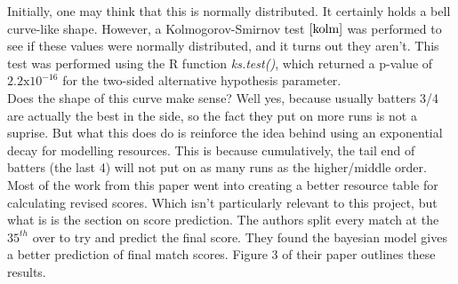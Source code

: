 Initially, one may think that this is normally distributed. It certainly holds a bell curve-like shape. However, a Kolmogorov-Smirnov test $\cite{kolm}$ was
performed to see if these values were normally distributed, and it turns out they aren't. This test was performed using the R function \textit{ks.test()}, which returned
a p-value of $2.2\text{x}10^{-16}$ for the two-sided alternative hypothesis parameter. \\

Does the shape of this curve make sense? Well yes, because usually batters 3/4 are actually the best in the side, so the fact they put on more runs is not a suprise.
But what this does do is reinforce the idea behind using an exponential decay for modelling resources. This is because cumulatively, the tail end of batters (the last 4) 
will not put on as many runs as the higher/middle order. \\

Most of the work from this paper went into creating a better resource table for calculating revised scores. Which isn't particularly relevant to this project, but what is 
is the section on score prediction. The authors split every match at the $35^{th}$ over to try and predict the final score. They found the bayesian model gives a better
prediction of final match scores. Figure 3 of their paper outlines these results.